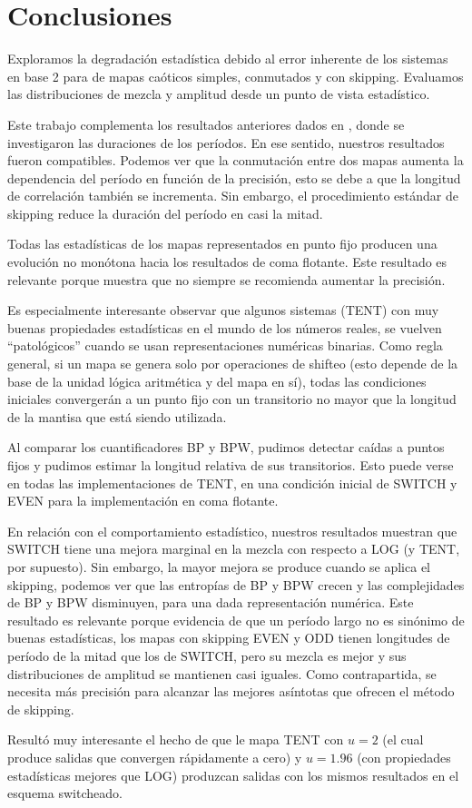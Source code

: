 \section{Conclusiones}

Exploramos la degradación estadística debido al error inherente de los sistemas en base 2 para de mapas caóticos simples, conmutados y con skipping.
Evaluamos las distribuciones de mezcla y amplitud desde un punto de vista estadístico.

Este trabajo complementa los resultados anteriores dados en \cite{Nagaraj2008}, donde se investigaron las duraciones de los períodos.
En ese sentido, nuestros resultados fueron compatibles.
Podemos ver que la conmutación entre dos mapas aumenta la dependencia del período en función de la precisión, esto se debe a que la longitud de correlación también se incrementa.
Sin embargo, el procedimiento estándar de skipping reduce la duración del período en casi la mitad.

Todas las estadísticas de los mapas representados en punto fijo producen una evolución no monótona hacia los resultados de coma flotante.
Este resultado es relevante porque muestra que no siempre se recomienda aumentar la precisión.

Es especialmente interesante observar que algunos sistemas (TENT) con muy buenas propiedades estadísticas en el mundo de los números reales, se vuelven ``patológicos'' cuando se usan representaciones numéricas binarias.
Como regla general, si un mapa se genera solo por operaciones de shifteo (esto depende de la base de la unidad lógica aritmética y del mapa en sí), todas las condiciones iniciales convergerán a un punto fijo con un transitorio no mayor que la longitud de la mantisa que está siendo utilizada.

Al comparar los cuantificadores BP y BPW, pudimos detectar caídas a puntos fijos y pudimos estimar la longitud relativa de sus transitorios.
Esto puede verse en todas las implementaciones de TENT, en una condición inicial de SWITCH y EVEN para la implementación en coma flotante.

En relación con el comportamiento estadístico, nuestros resultados muestran que SWITCH tiene una mejora marginal en la mezcla con respecto a LOG (y TENT, por supuesto).
Sin embargo, la mayor mejora se produce cuando se aplica el skipping, podemos ver que las entropías de BP y BPW crecen y las complejidades de BP y BPW disminuyen, para una dada representación numérica.
Este resultado es relevante porque evidencia de que un período largo no es sinónimo de buenas estadísticas, los mapas con skipping EVEN y ODD tienen longitudes de período de la mitad que los de SWITCH, pero su mezcla es mejor y sus distribuciones de amplitud se mantienen casi iguales.
Como contrapartida, se necesita más precisión para alcanzar las mejores asíntotas que ofrecen el método de skipping.

Resultó muy interesante el hecho de que le mapa TENT con $u=2$ (el cual produce salidas que convergen rápidamente a cero) y $u=1.96$ (con propiedades estadísticas mejores que LOG) produzcan salidas con los mismos resultados en el esquema switcheado.